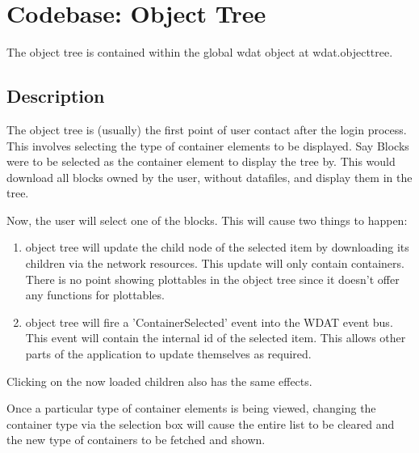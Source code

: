 \chapter{Codebase: Object Tree}

The object tree is contained within the global wdat object at
wdat.objecttree.

\section{Description}

The object tree is (usually) the first point of user contact after the
login process.  This involves selecting the type of container elements
to be displayed.  Say Blocks were to be selected as the container
element to display the tree by.  This would download all blocks owned
by the user, without datafiles, and display them in the tree.

Now, the user will select one of the blocks.  This will cause two
things to happen:

\begin{enumerate}
  \item
  object tree will update the child node of the selected item by
  downloading its children via the network resources. This update will
  only contain containers.  There is no point showing plottables in
  the object tree since it doesn't offer any functions for plottables.

  \item
  object tree will fire a 'ContainerSelected' event into the WDAT
  event bus.  This event will contain the internal id of the selected
  item.  This allows other parts of the application to update
  themselves as required. 
\end{enumerate}

Clicking on the now loaded children also has the same effects.

Once a particular type of container elements is being viewed, changing
the container type via the selection box will cause the entire list to
be cleared and the new type of containers to be fetched and shown.

